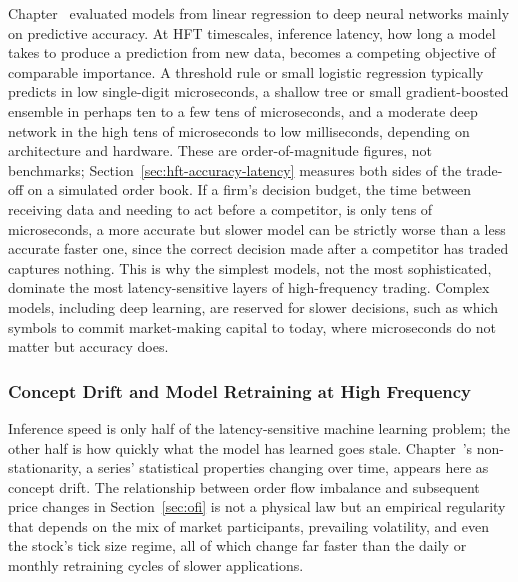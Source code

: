 \documentclass[../ai_in_finance]{subfiles}
\begin{document}
Chapter~ evaluated models from linear regression to deep neural networks mainly on predictive accuracy. At HFT timescales, inference latency, how long a model takes to produce a prediction from new data, becomes a competing objective of comparable importance. A threshold rule or small logistic regression typically predicts in low single-digit microseconds, a shallow tree or small gradient-boosted ensemble in perhaps ten to a few tens of microseconds, and a moderate deep network in the high tens of microseconds to low milliseconds, depending on architecture and hardware. These are order-of-magnitude figures, not benchmarks; Section~\ref{sec:hft-accuracy-latency} measures both sides of the trade-off on a simulated order book. If a firm's decision budget, the time between receiving data and needing to act before a competitor, is only tens of microseconds, a more accurate but slower model can be strictly worse than a less accurate faster one, since the correct decision made after a competitor has traded captures nothing. This is why the simplest models, not the most sophisticated, dominate the most latency-sensitive layers of high-frequency trading. Complex models, including deep learning, are reserved for slower decisions, such as which symbols to commit market-making capital to today, where microseconds do not matter but accuracy does.

\subsubsection*{Concept Drift and Model Retraining at High Frequency}

Inference speed is only half of the latency-sensitive machine learning problem; the other half is how quickly what the model has learned goes stale. Chapter~'s non-stationarity, a series' statistical properties changing over time, appears here as concept drift. The relationship between order flow imbalance and subsequent price changes in Section~\ref{sec:ofi} is not a physical law but an empirical regularity that depends on the mix of market participants, prevailing volatility, and even the stock's tick size regime, all of which change far faster than the daily or monthly retraining cycles of slower applications.
\end{document}
